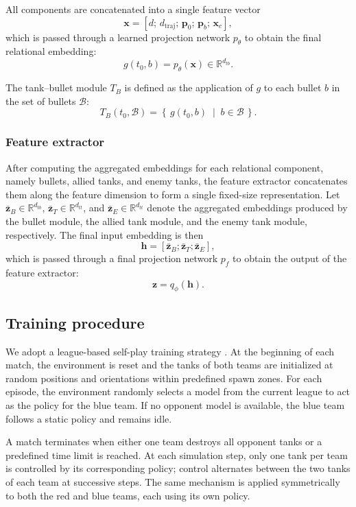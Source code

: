 \documentclass[conf]{new-aiaa}
\begin{document}
All components are concatenated into a single feature vector
\[
\mathbf{x}
=
[d;\,d_{\text{traj}};\,\mathbf{p}_0;\,\mathbf{p}_b;\,\mathbf{x}_{c}],
\]
which is passed through a learned projection network $p_{\theta}$ to obtain the final relational embedding:
\[
g(t_0, b) = p_{\theta}(\mathbf{x}) \in \mathbb{R}^{d_{tb}}.
\]

The tank--bullet module $T_B$ is defined as the application of $g$ to each bullet $b$ in the set of bullets $\mathcal{B}$:
\[
T_B(t_0, \mathcal{B}) =
\left\{\, g(t_0, b) \;\middle|\; b \in \mathcal{B} \,\right\}.
\]

\subsubsection{Feature extractor}
After computing the aggregated embeddings for each relational component, namely bullets, allied tanks, and enemy tanks, the feature extractor concatenates them along the feature dimension to form a single fixed-size representation. Let
$\bar{\mathbf{z}}_{B}\in\mathbb{R}^{d_{tb}}$,
$\bar{\mathbf{z}}_{T}\in\mathbb{R}^{d_{tt}}$, and
$\bar{\mathbf{z}}_{E}\in\mathbb{R}^{d_{tt}}$
denote the aggregated embeddings produced by the bullet module, the allied tank module, and the enemy tank module, respectively. The final input embedding is then
\[
\mathbf{h} = [\bar{\mathbf{z}}_{B};\bar{\mathbf{z}}_{T};\bar{\mathbf{z}}_{E}],
\]
which is passed through a final projection network $p_f$  to obtain the output of the feature extractor:
\[
\mathbf{z} = q_{\phi}(\mathbf{h}).
\]

\subsection{Training procedure}

We adopt a league-based self-play training strategy \cite{NASHSelfPlaying}. At the beginning of each match, the environment is reset and the tanks of both teams are initialized at random positions and orientations within predefined spawn zones. For each episode, the environment randomly selects a model from the current league to act as the policy for the blue team. If no opponent model is available, the blue team follows a static policy and remains idle.

A match terminates when either one team destroys all opponent tanks or a predefined time limit is reached. At each simulation step, only one tank per team is controlled by its corresponding policy; control alternates between the two tanks of each team at successive steps. The same mechanism is applied symmetrically to both the red and blue teams, each using its own policy.
\end{document}
